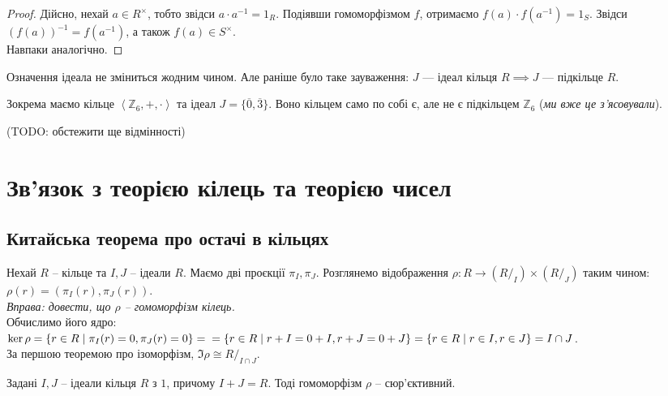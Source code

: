 \documentclass{math_library}
\begin{document}
\begin{proof}
Дійсно, нехай $a \in R^\times$, тобто звідси $a \cdot a^{-1} = 1_R$. Подіявши гомоморфізмом $f$, отримаємо $f(a) \cdot f(a^{-1}) = 1_S$. Звідси $(f(a))^{-1} = f(a^{-1})$, а також $f(a) \in S^\times$.\\
Навпаки аналогічно.
\end{proof}

Означення ідеала не зміниться жодним чином. Але раніше було таке зауваження: $J$ --- ідеал кільця $R \implies J$ --- підкільце $R$. \color{red}{Зараз це вже --- неправда.}
\color{black}{}

\begin{example}
Зокрема маємо кільце $\left< \mathbb{Z}_6, +, \cdot \right>$ та ідеал $J = \{\overline{0},\overline{3}\}$. Воно кільцем само по собі є, але не є підкільцем $\mathbb{Z}_6$ (\textit{ми вже це з'ясовували}).
\end{example}

(TODO: обстежити ще відмінності)
\newpage


\section{Зв'язок з теорією кілець та теорією чисел}
\subsection{Китайська теорема про остачі в кільцях}
Нехай $R$ -- кільце та $I,J$ -- ідеали $R$. Маємо дві проєкції $\pi_I, \pi_J$. Розглянемо відображення $\rho \colon R \to (R/_I) \times (R/_J)$ таким чином:\\
$\rho(r) = (\pi_I(r),\pi_J(r))$.\\
\textit{Вправа: довести, що $\rho$ -- гомоморфізм кілець.}\\
Обчислимо його ядро:\\
$\ker \rho = \{r \in R \mid \pi_I(r) = 0, \pi_J(r) = 0\} = \\ = \{r \in R \mid r+I = 0+I, r+J = 0+J\} = \{r \in R \mid r \in I, r \in J\} = I \cap J$.\\
За першою теоремою про ізоморфізм, $\Im \rho \cong R/_{I \cap J}$.

\begin{proposition}
Задані $I,J$ -- ідеали кільця $R$ з $1$, причому $I+J = R$. Тоді гомоморфізм $\rho$ -- сюр'єктивний.
\end{proposition}
\end{document}
